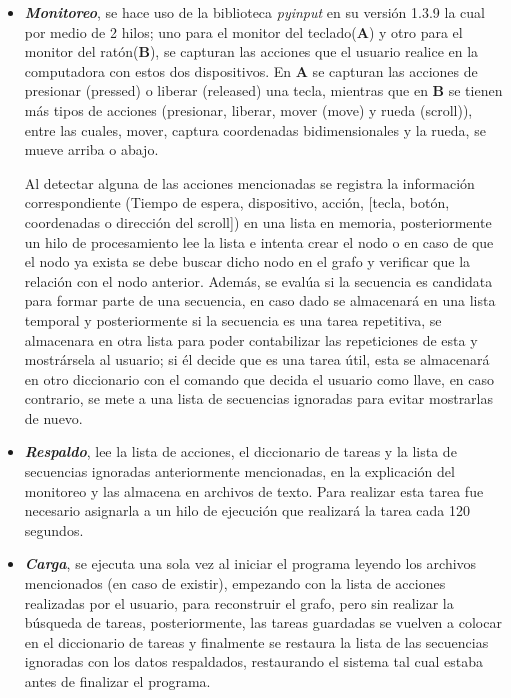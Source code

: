 \begin{itemize}

\item {\textbf{\emph{Monitoreo}}, se hace uso de la biblioteca
 \emph{pyinput} en su versi\'on 1.3.9 la cual por medio de 2 hilos; uno para 
 el monitor del teclado(\textbf{A}) y otro para el monitor del 
 rat\'on(\textbf{B}), se capturan las acciones que el usuario realice en la 
 computadora con estos dos dispositivos. En \textbf{A} se capturan las 
 acciones de presionar (pressed) o liberar (released) una tecla, mientras 
 que en \textbf{B} se tienen m\'as tipos de acciones (presionar, liberar, 
 mover (move) y rueda (scroll)), entre las cuales, mover, captura 
 coordenadas bidimensionales y la rueda, se mueve arriba o abajo. 



Al detectar alguna de las acciones mencionadas se registra la informaci\'on
 correspondiente (Tiempo de espera, dispositivo, acci\'on, [tecla, bot\'on, 
 coordenadas o direcci\'on del scroll]) en una lista en memoria, 
 posteriormente un hilo de 
 procesamiento lee la lista e intenta crear el nodo o en caso de que el nodo 
 ya exista se debe buscar dicho nodo en el grafo y verificar que la
 relaci\'on con el nodo anterior. Adem\'as, se eval\'ua si la secuencia es 
 candidata para formar parte de una secuencia, en caso dado se almacenar\'a 
 en una lista temporal y posteriormente si la secuencia es una tarea 
 repetitiva, se almacenara en otra lista para poder contabilizar las 
 repeticiones de esta y mostr\'arsela al usuario; si \'el decide que es 
 una tarea \'util, esta se almacenar\'a en otro diccionario con el comando
 que decida el usuario como llave, en caso contrario, se mete a una lista de 
 secuencias ignoradas para evitar mostrarlas de nuevo.}

\item { \textbf{\emph{Respaldo}}, lee la lista de acciones, el diccionario
 de tareas y la lista de secuencias ignoradas anteriormente mencionadas, en 
 la explicaci\'on del monitoreo y las almacena en archivos de texto. Para
 realizar esta tarea fue necesario asignarla a un hilo de ejecuci\'on que
 realizar\'a la tarea cada 120 segundos.}


\item{ \textbf{\emph{Carga}}, se ejecuta una sola vez al iniciar el programa 
 leyendo los archivos mencionados (en caso de existir), empezando con la 
 lista de acciones realizadas por el usuario, para reconstruir el grafo, 
 pero sin realizar la b\'usqueda de tareas, posteriormente, las tareas 
 guardadas se vuelven a colocar en el diccionario de tareas y finalmente se 
 restaura la lista de las secuencias ignoradas con los datos respaldados, 
 restaurando el sistema tal cual estaba antes de finalizar el programa.}



\end{itemize}
